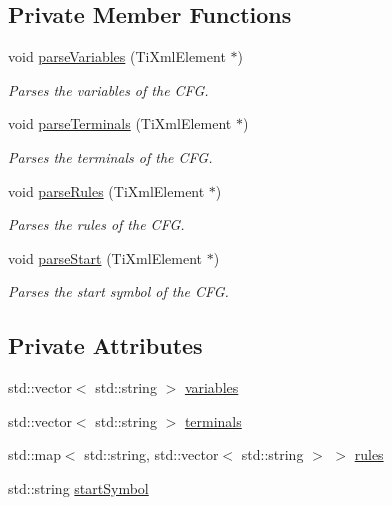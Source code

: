 \subsection*{\-Private \-Member \-Functions}
\begin{DoxyCompactItemize}
\item 
void \hyperlink{classparser_1_1CFGParser_a8825f263a7d78ca9ea3e1975dca5a22e}{parse\-Variables} (\-Ti\-Xml\-Element $\ast$)
\begin{DoxyCompactList}\small\item\em \-Parses the variables of the \-C\-F\-G. \end{DoxyCompactList}\item 
void \hyperlink{classparser_1_1CFGParser_adc9127ccdb636a5a05e78b3f1fc8b9fa}{parse\-Terminals} (\-Ti\-Xml\-Element $\ast$)
\begin{DoxyCompactList}\small\item\em \-Parses the terminals of the \-C\-F\-G. \end{DoxyCompactList}\item 
void \hyperlink{classparser_1_1CFGParser_a800e4c71a5666661aa27497f190ea77e}{parse\-Rules} (\-Ti\-Xml\-Element $\ast$)
\begin{DoxyCompactList}\small\item\em \-Parses the rules of the \-C\-F\-G. \end{DoxyCompactList}\item 
void \hyperlink{classparser_1_1CFGParser_a2015d0db934eb8cceb8f236017c49469}{parse\-Start} (\-Ti\-Xml\-Element $\ast$)
\begin{DoxyCompactList}\small\item\em \-Parses the start symbol of the \-C\-F\-G. \end{DoxyCompactList}\end{DoxyCompactItemize}
\subsection*{\-Private \-Attributes}
\begin{DoxyCompactItemize}
\item 
std\-::vector$<$ std\-::string $>$ \hyperlink{classparser_1_1CFGParser_a683c57ac6f377ad4fa4c074df294ee4d}{variables}
\item 
std\-::vector$<$ std\-::string $>$ \hyperlink{classparser_1_1CFGParser_a5709544c0a9981997043f38489f2ddff}{terminals}
\item 
std\-::map$<$ std\-::string, \*
std\-::vector$<$ std\-::string $>$ $>$ \hyperlink{classparser_1_1CFGParser_a2848eb1b568b538e2f49d237cd32351d}{rules}
\item 
std\-::string \hyperlink{classparser_1_1CFGParser_a6d3a8eefa11cca703d7126031c59d220}{start\-Symbol}
\end{DoxyCompactItemize}


